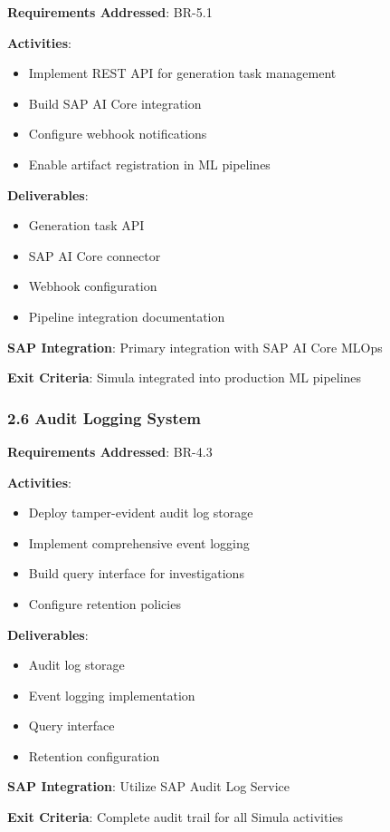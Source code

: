 \begin{tcolorbox}[colback=green!5,colframe=green!70,title=2.5 MLOps Integration]
\textbf{Requirements Addressed}: BR-5.1

\textbf{Activities}:
\begin{itemize}
  \item Implement REST API for generation task management
  \item Build SAP AI Core integration
  \item Configure webhook notifications
  \item Enable artifact registration in ML pipelines
\end{itemize}

\textbf{Deliverables}:
\begin{itemize}
  \item Generation task API
  \item SAP AI Core connector
  \item Webhook configuration
  \item Pipeline integration documentation
\end{itemize}

\textbf{SAP Integration}: Primary integration with SAP AI Core MLOps

\textbf{Exit Criteria}: Simula integrated into production ML pipelines
\end{tcolorbox}

\subsubsection{2.6 Audit Logging System}

\begin{tcolorbox}[colback=green!5,colframe=green!70,title=2.6 Audit Trail]
\textbf{Requirements Addressed}: BR-4.3

\textbf{Activities}:
\begin{itemize}
  \item Deploy tamper-evident audit log storage
  \item Implement comprehensive event logging
  \item Build query interface for investigations
  \item Configure retention policies
\end{itemize}

\textbf{Deliverables}:
\begin{itemize}
  \item Audit log storage
  \item Event logging implementation
  \item Query interface
  \item Retention configuration
\end{itemize}

\textbf{SAP Integration}: Utilize SAP Audit Log Service

\textbf{Exit Criteria}: Complete audit trail for all Simula activities
\end{tcolorbox}

